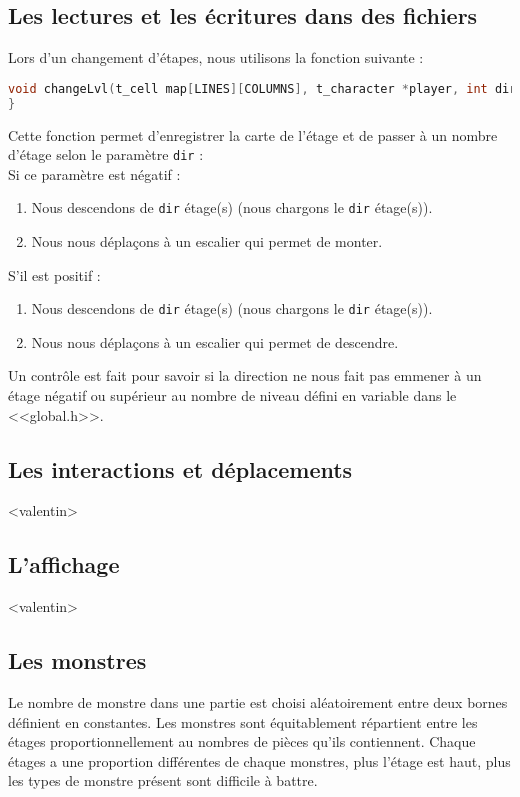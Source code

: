 \documentclass[11pt]{report}
\begin{document}
		\subsection{Les lectures et les écritures dans des fichiers}
		
		Lors d'un changement d'étapes, nous utilisons la fonction suivante : \begin{lstlisting}[caption=changeLvl, language=C,style=Cstyle]
void changeLvl(t_cell map[LINES][COLUMNS], t_character *player, int dir){
}
		\end{lstlisting}
		Cette fonction permet d'enregistrer la carte de l'étage et de passer à un nombre d'étage selon le paramètre \texttt{dir} : \\
		Si ce paramètre est négatif : 
		\begin{enumerate}
			\item  Nous descendons de \texttt{dir} étage(s) (nous chargons le \texttt{dir} étage(s)).
			\item Nous nous déplaçons à un escalier qui permet de monter.
		\end{enumerate}
		S'il est positif : 
		\begin{enumerate}
			\item  Nous descendons de \texttt{dir} étage(s) (nous chargons le \texttt{dir} étage(s)).
			\item Nous nous déplaçons à un escalier qui permet de descendre.
		\end{enumerate}
		Un contrôle est fait pour savoir si la direction ne nous fait pas emmener à un étage négatif ou supérieur au nombre de niveau défini en variable dans le <<global.h>>.
		\subsection{Les interactions et déplacements}
		
		<valentin>
		
		\subsection{L'affichage}
		
		<valentin>
		
		\subsection{Les monstres}
		
		Le nombre de monstre dans une partie est choisi aléatoirement entre deux bornes définient en constantes.
		Les monstres sont équitablement répartient entre les étages proportionnellement au nombres de pièces qu'ils contiennent. Chaque étages a une proportion différentes de chaque monstres, plus l'étage est haut, plus les types de monstre présent sont difficile à battre.
		
\end{document}

